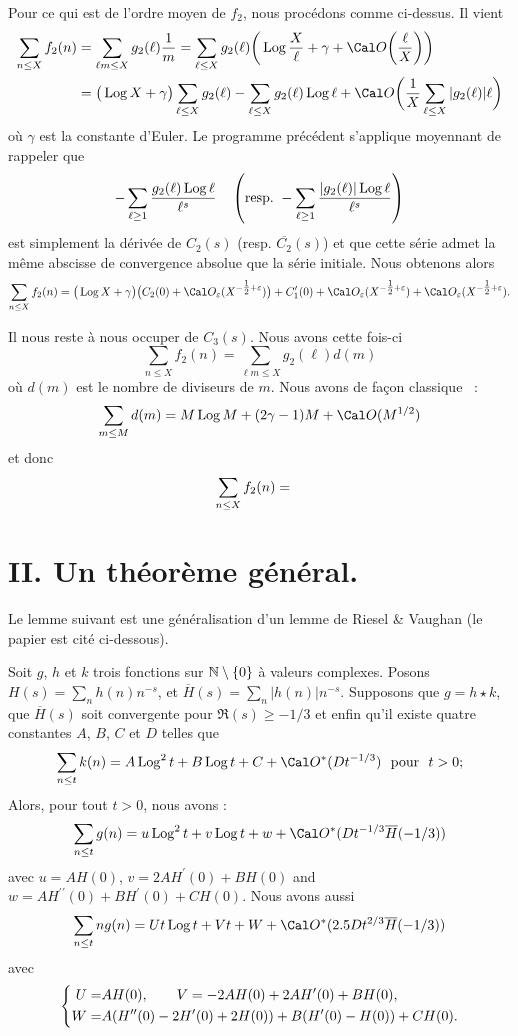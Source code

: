 \bigskip
Pour ce qui est de l'ordre moyen de $f_2$, nous proc\'edons comme
ci-dessus. Il vient
$$
\aligned
\sum_{n\le X}f_2(n)
&=\sum_{\ell m\le X}g_2(\ell)\frac{1}m
=\sum_{\ell\le X}g_2(\ell)
\bigg(\Log\frac X\ell+\gamma
+\Cal O\bigg(\frac \ell X\bigg)\bigg)
\\&=
\big(\Log X +\gamma\big)\sum_{\ell\le X}g_2(\ell)
-\sum_{\ell\le X}g_2(\ell)\Log\ell
+\Cal O\bigg(\frac1X\sum_{\ell\le X}|g_2(\ell)|\ell\bigg)
\endaligned
$$
o\`u $\gamma$ est la constante d'Euler. 
Le programme pr\'ec\'edent s'applique moyennant de rappeler que
$$
-\sum_{\ell\ge1}\frac{g_2(\ell)\Log\ell}{\ell^s}
\quad\left( \text{resp.}\ 
-\sum_{\ell\ge1}\frac{|g_2(\ell)|\Log\ell}{\ell^s} \right)
$$
est simplement la d\'eriv\'ee de $C_2(s)$ (resp. $\overline{C_2}(s)$)
et que cette s\'erie admet la m\^eme abscisse de convergence absolue
que la s\'erie initiale. Nous obtenons alors
$$
\sum_{n\le X}f_2(n)=
\big(\Log X +\gamma\big)\big(C_2(0)+\Cal O_\ve(X^{-\tfrac12+\ve})\big)
+C'_1(0)+\Cal O_\ve(X^{-\tfrac12+\ve})+\Cal O_\ve(X^{-\tfrac12+\ve}).
$$

\bigskip
Il nous reste \`a nous occuper de $C_3(s)$. Nous avons cette fois-ci
$$
\sum_{n\le X}f_2(n)
=\sum_{\ell m\le X}g_2(\ell)d(m)
$$
o\`u $d(m)$ est le nombre de diviseurs de $m$. Nous avons de fa\c con
classique ~:
$$
\sum_{m\le M}d(m)=M\Log M+(2\gamma-1)M+\Cal O(M^{1/2})
$$
et donc
$$
\aligned
\sum_{n\le X}f_2(n)
&=
\endaligned
$$

\section{II. Un th\'eor\`eme g\'en\'eral.}

Le lemme suivant est une g\'en\'eralisation d'un lemme de Riesel \&
Vaughan (le papier est cit\'e ci-dessous).
\def\O{\Cal O^*}

Soit $g$, $h$ et $k$ trois fonctions sur $\Bbb N\setminus\{0\}$ \`a
valeurs complexes.
Posons $H(s)=\sum_nh(n)n^{-s}$, et
$\overline{H}(s)=\sum_n|h(n)|n^{-s}$.
Supposons que $g=h\star k$, que $\overline{H}(s)$ soit convergente pour
$\Re(s)\ge-1/3$ et enfin qu'il existe quatre constantes
$A$, $B$, $C$ et $D$ telles que
$$
\sum_{n\le t}k(n)
=
A\Log^2t+B\Log t+C+\O(D t^{-1/3})
\text{\ \ pour\ \ }
t>0;
$$
Alors, pour tout $t>0$, nous avons :
$$
\sum_{n\le t}g(n)
=
u\Log^2t+v\Log t+w+\O(D t^{-1/3}\overline{H}(-1/3))
$$
avec
$u=AH(0)$, $v=2AH^{\prime}(0)+BH(0)$ and $w=AH^{\prime\prime}(0)+BH^{\prime}(0)+CH(0)$.
Nous avons aussi
$$
\sum_{n\le t}ng(n)
=
Ut\Log t+Vt+W+\O(2.5D t^{2/3}\overline{H}(-1/3))
$$
avec
$$
\left\{\aligned
U=&AH(0),\text{\ \ \ \ \ \ }V=-2AH(0)+2AH^{\prime}(0)+BH(0),\\
W=&A(H^{\prime\prime}(0)-2H^{\prime}(0)+2H(0))+B(H^{\prime}(0)-H(0))+CH(0).
\endaligned\right.
$$
\endproclaim

